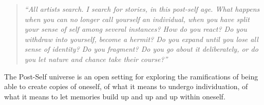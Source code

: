 \begin{quote}
\emph{``All artists search. I search for stories, in this post-self age. What happens when you can no longer call yourself an individual, when you have split your sense of self among several instances? How do you react? Do you withdraw into yourself, become a hermit? Do you expand until you lose all sense of identity? Do you fragment? Do you go about it deliberately, or do you let nature and chance take their course?''}
\end{quote}

\noindent The Post-Self universe is an open setting for exploring the ramifications of being able to create copies of oneself, of what it means to undergo individuation, of what it means to let memories build up and up and up within oneself.

%
